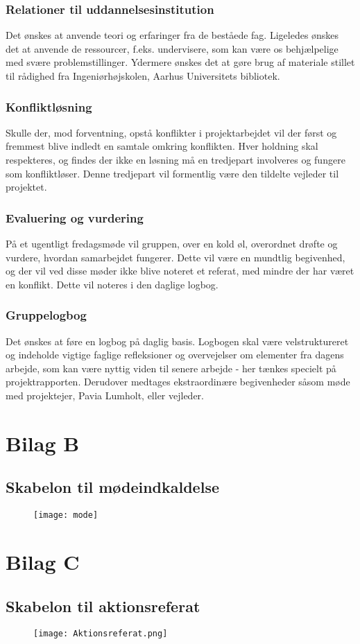 \subsubsection{Relationer til uddannelsesinstitution}
Det ønskes at anvende teori og erfaringer fra de beståede fag. Ligeledes ønskes det at anvende de ressourcer, f.eks. undervisere, som kan være os behjælpelige med svære problemstillinger. Ydermere ønskes det at gøre brug af materiale stillet til rådighed fra Ingeniørhøjskolen, Aarhus Universitets bibliotek. 

\subsubsection{Konfliktløsning}
Skulle der, mod forventning, opstå konflikter i projektarbejdet vil der først og fremmest blive indledt en samtale omkring konflikten. Hver holdning skal respekteres, og findes der ikke en løsning må en tredjepart involveres og fungere som konfliktløser. Denne tredjepart vil formentlig være den tildelte vejleder til projektet.   

\subsubsection{Evaluering og vurdering}
På et ugentligt fredagsmøde vil gruppen, over en kold øl, overordnet drøfte og vurdere, hvordan samarbejdet fungerer. Dette vil være en mundtlig begivenhed, og der vil ved disse møder ikke blive noteret et referat, med mindre der har været en konflikt. Dette vil noteres i den daglige logbog.

\subsubsection{Gruppelogbog} 
Det ønskes at føre en logbog på daglig basis. Logbogen skal være velstruktureret og  indeholde vigtige faglige refleksioner og overvejelser om elementer fra dagens arbejde, som kan være nyttig viden til senere arbejde - her tænkes specielt på projektrapporten. Derudover medtages ekstraordinære begivenheder såsom møde med projektejer, Pavia Lumholt, eller vejleder.     

\newpage

\section{Bilag B}

\subsection{Skabelon til mødeindkaldelse}
\label{App:skabelon}
\begin{figure}[htb]
\centering
\texttt{[image: mode]}	
\end{figure}

\newpage

\section{Bilag C}
\subsection{Skabelon til aktionsreferat}
\label{App:skabelonak}
\begin{figure}[htb]
\centering
\texttt{[image: Aktionsreferat.png]}	
\end{figure}


 